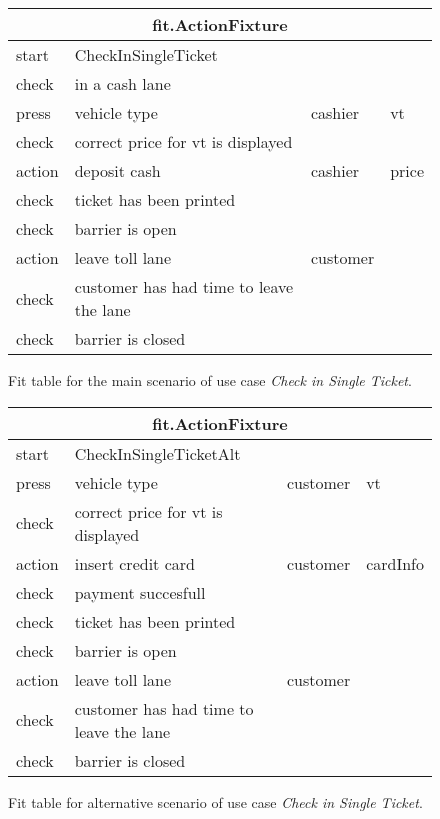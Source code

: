 \begin{figure}[H]
\centering
\begin{tabular}{|l|l|l|l|}
\hline \multicolumn{4}{|c|}{fit.ActionFixture}\tabularnewline
\hline start & \multicolumn{1}{l}{CheckInSingleTicket} & \multicolumn{1}{l}{} & \tabularnewline 
\hline check & \multicolumn{1}{l}{in a cash lane} & \multicolumn{1}{l}{} & \tabularnewline
\hline press & vehicle type & cashier & vt \tabularnewline
\hline check & \multicolumn{1}{l}{correct price for vt is displayed} & \multicolumn{1}{l}{} & \tabularnewline
\hline action & deposit cash & cashier & price \tabularnewline
\hline check & \multicolumn{1}{l}{ticket has been printed} & \multicolumn{1}{l}{} & \tabularnewline
\hline check & \multicolumn{1}{l}{barrier is open} & \multicolumn{1}{l}{} & \tabularnewline
\hline action & leave toll lane & \multicolumn{1}{l}{customer} & \tabularnewline
\hline check & \multicolumn{1}{l}{customer has had time to leave the lane} & \multicolumn{1}{l}{} & \tabularnewline
\hline check & \multicolumn{1}{l}{barrier is closed} & \multicolumn{1}{l}{} & \tabularnewline
\hline 
\end{tabular}
\caption{Fit table for the main scenario of use case \emph{Check in Single Ticket}.}
\end{figure}

\begin{figure}[H]
\centering
\begin{tabular}{|l|l|l|l|}
\hline \multicolumn{4}{|c|}{fit.ActionFixture}\tabularnewline
\hline start & \multicolumn{1}{l}{CheckInSingleTicketAlt} & \multicolumn{1}{l}{} & \tabularnewline
\hline press & vehicle type & customer & vt \tabularnewline
\hline check & \multicolumn{1}{l}{correct price for vt is displayed} & \multicolumn{1}{l}{} & \tabularnewline
\hline action & insert credit card & customer & cardInfo \tabularnewline
\hline check & \multicolumn{1}{l}{payment succesfull} & \multicolumn{1}{l}{} & \tabularnewline
\hline check & \multicolumn{1}{l}{ticket has been printed} & \multicolumn{1}{l}{} & \tabularnewline
\hline check & \multicolumn{1}{l}{barrier is open} & \multicolumn{1}{l}{} & \tabularnewline
\hline action & leave toll lane & customer & \tabularnewline
\hline check & \multicolumn{1}{l}{customer has had time to leave the lane} & \multicolumn{1}{l}{} & \tabularnewline
\hline check & \multicolumn{1}{l}{barrier is closed} & \multicolumn{1}{l}{} & \tabularnewline
\hline 
\end{tabular}
\caption{Fit table for alternative scenario of use case \emph{Check in Single Ticket}.}
\end{figure}
